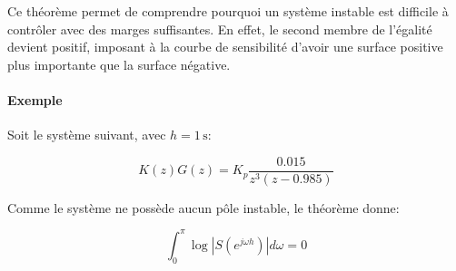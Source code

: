 \documentclass[11pt]{article}
\begin{document}
    Ce théorème permet de comprendre pourquoi un système instable est
difficile à contrôler avec des marges suffisantes. En effet, le second
membre de l'égalité devient positif, imposant à la courbe de sensibilité
d'avoir une surface positive plus importante que la surface négative.

    \paragraph{Exemple}\label{exemple}

Soit le système suivant, avec \(h=1\, \mathrm{s}\):

\[ K(z)G(z) = K_p \frac{0.015}{z^3(z-0.985)} \]

    Comme le système ne possède aucun pôle instable, le théorème donne:

\[ \int_0^{\pi} \log \left| S(e^{j\omega h})\right| d\omega = 0 \]
\end{document}
